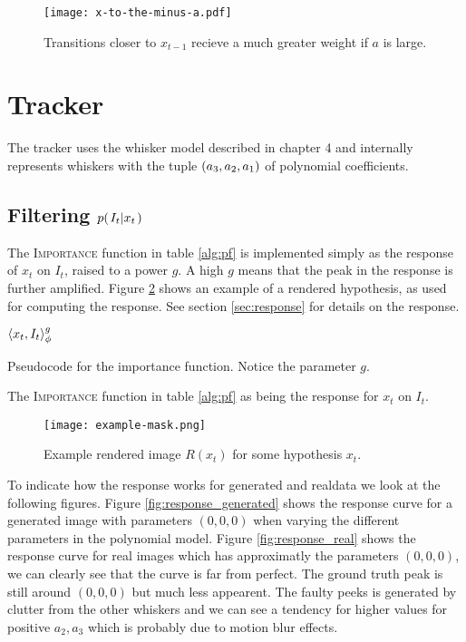 \begin{figure}[ht]
  \centering
  \texttt{[image: x-to-the-minus-a.pdf]}
  \caption{Transitions closer to $x_{t-1}$ recieve a much greater
    weight if $a$ is large.}
  \label{fig:x-to-the-minus-a}
\end{figure}

\section{Tracker}

The tracker uses the whisker model described in chapter 4 and
internally represents whiskers with the tuple $\left( a_3, a_2, a_1 \right)$ of polynomial
coefficients.

\subsection{Filtering $p{(\left. I_t \middle\vert x_t \right.)}$}
\label{sec:filtering}
The \textsc{Importance} function in table \ref{alg:pf} is implemented
simply as the response of $x_t$ on $I_t$, raised to a power $g$. A
high $g$ means that the peak in the response is further
amplified. Figure \ref{fig:example-mask} shows an example of a
rendered hypothesis, as used for computing the response. See section
\ref{sec:response} for details on the response.

\begin{table}[h]
  \begin{codebox}
    \li \Return $\langle x_t, I_t\rangle_{\phi}^g$
  \end{codebox}
  \caption{Pseudocode for the importance function. Notice the parameter $g$.}
  \label{alg:importance}
\end{table}

The \textsc{Importance} function in table \ref{alg:pf} as being the response for $x_t$ on $I_t$.
\begin{figure}[h]
  \centering
  \texttt{[image: example-mask.png]}
  \caption{Example rendered image $R(x_t)$ for some hypothesis $x_t$.}
  \label{fig:example-mask}
\end{figure}

To indicate how the response works for generated and realdata we look at the following figures.
Figure \ref{fig:response_generated} shows the response curve for a generated image with parameters $(0,0,0)$ when varying the different parameters in the polynomial model.
Figure \ref{fig:response_real} shows the response curve for real images which has approximatly the parameters $(0,0,0)$, we can clearly see that the curve is far from perfect. 
The ground truth peak is still around $(0,0,0)$ but much less appearent.
The faulty peeks is generated by clutter from the other whiskers and we can see a tendency for higher values for positive $a_2,a_3$ which is probably due to motion blur effects.

